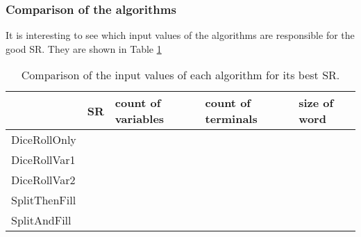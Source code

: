 \subsubsection{Comparison of the algorithms}
It is interesting to see which input values of the algorithms are responsible for the good SR. They are shown in Table \ref{inputValuesOfBestSuccessRate}
\begin{table}[h]
	\centering
	\begin{tabular}{l|l|l|l|l|}
		\cline{2-5}
		& SR & count of variables & count of terminals & size of word \\ \hline
		\multicolumn{1}{|l|}{DiceRollOnly}  &    &                    &                    &              \\ \hline
		\multicolumn{1}{|l|}{DiceRollVar1}  &    &                    &                    &              \\ \hline
		\multicolumn{1}{|l|}{DiceRollVar2}  &    &                    &                    &              \\ \hline
		\multicolumn{1}{|l|}{SplitThenFill} &    &                    &                    &              \\ \hline
		\multicolumn{1}{|l|}{SplitAndFill}  &    &                    &                    &              \\ \hline
	\end{tabular}
	\caption{Comparison of the input values of each algorithm for its best SR. }
	\label{inputValuesOfBestSuccessRate}
\end{table}


